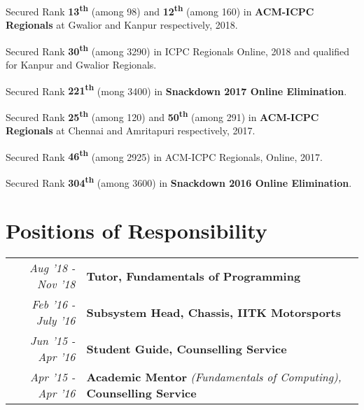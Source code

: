 \documentclass[a4paper]{norm-resume}
\begin{document}
\begin{tightitemize}
        \small
        {
        \item Secured Rank \textbf{13\textsuperscript{th}} (among 98) and \textbf{12\textsuperscript{th}} (among 160) in \textbf{ACM-ICPC Regionals} at Gwalior and Kanpur respectively, 2018.
        \item Secured Rank \textbf{30\textsuperscript{th}} (among 3290) in ICPC Regionals Online, 2018 and qualified for Kanpur and Gwalior Regionals.
        \item Secured Rank \textbf{221\textsuperscript{th}} (mong 3400) in \textbf{Snackdown 2017 Online Elimination}.
        \item Secured Rank \textbf{25\textsuperscript{th}} (among 120) and \textbf{50\textsuperscript{th}} (among 291) in \textbf{ACM-ICPC Regionals} at Chennai and Amritapuri respectively, 2017.
        \item Secured Rank \textbf{46\textsuperscript{th}} (among 2925) in ACM-ICPC Regionals, Online, 2017.
        \item Secured Rank \textbf{304\textsuperscript{th}} (among 3600) in \textbf{Snackdown 2016 Online Elimination}.
        }
\end{tightitemize}

\vspace{2mm}    %


\section{Positions of Responsibility \hrulefill}

\begin{tabular}{r|p{16cm}}
    \emph{Aug '18 - Nov '18}  & \textbf{Tutor, Fundamentals of Programming}\\
    \emph{Feb '16 - July '16} & \textbf{Subsystem Head, Chassis, IITK Motorsports}\\
    \emph{Jun '15 - Apr '16}  & \textbf{Student Guide, Counselling Service}\\
    \emph{Apr '15 - Apr '16}  & \textbf{Academic Mentor }\emph{(Fundamentals of Computing),  }\textbf{Counselling Service}\\
\end{tabular}
\end{document}
